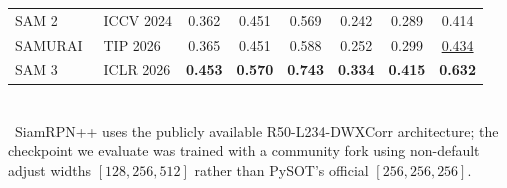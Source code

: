 \begin{table}[t]
{\begin{tabular}{l l ccc ccc}
SAM 2~\cite{ravi2024sam}           & ICCV 2024  & 0.362             & 0.451             & 0.569             & 0.242             & 0.289             & 0.414             \\
SAMURAI~\cite{yang2026samurai}     & TIP 2026   & 0.365             & 0.451             & 0.588             & 0.252             & 0.299             & \underline{0.434} \\
SAM 3~\cite{carion2026sam3}        & ICLR 2026  & \textbf{0.453}    & \textbf{0.570}    & \textbf{0.743}    & \textbf{0.334}    & \textbf{0.415}    & \textbf{0.632}    \\
\bottomrule
\end{tabular}
}
\\[2pt]
{\footnotesize \textsuperscript{\dag}~SiamRPN++ uses the publicly available R50-L234-DWXCorr architecture; the checkpoint we evaluate was trained with a community fork using non-default adjust widths $[128, 256, 512]$ rather than PySOT's official $[256, 256, 256]$.}
\end{table}
